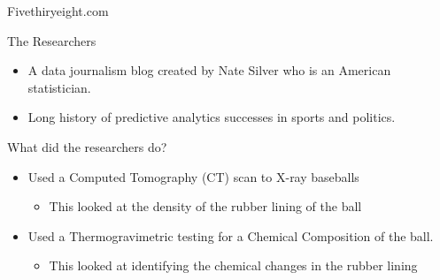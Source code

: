 \documentclass[14pt]{bredelebeamer}
\begin{document}
\begin{frame}{Fivethiryeight.com}
\begin{block}{The Researchers}

	\begin{itemize}
		\item A data journalism blog created by Nate Silver who is an American statistician.
		\item Long history of predictive analytics successes in sports and politics.
	\end{itemize}
\end{block}  
\begin{block}{What did the researchers do?}

	\begin{itemize}
        \item Used a Computed Tomography (CT) scan to X-ray baseballs 
        \begin{itemize}
        \item This looked at the density of the rubber lining of the ball 
        \end{itemize}
		\item Used a Thermogravimetric testing for a Chemical Composition of the ball.
        \begin{itemize}
        \item This looked at identifying the chemical changes in the rubber lining   
        \end{itemize}
	\end{itemize}
\end{block}  
\end{frame}
\end{document}
